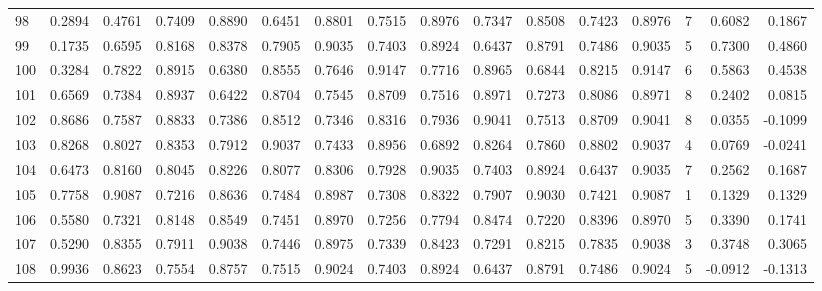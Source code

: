 \begin{tabular}{lrrrrrrrrrrrrrrr}
98  &      0.2894 &  0.4761 &  0.7409 &  0.8890 &  0.6451 &  0.8801 &  0.7515 &  0.8976 &  0.7347 &  0.8508 &   0.7423 &     0.8976 &      7 &                    0.6082 &                     0.1867 \\
99  &      0.1735 &  0.6595 &  0.8168 &  0.8378 &  0.7905 &  0.9035 &  0.7403 &  0.8924 &  0.6437 &  0.8791 &   0.7486 &     0.9035 &      5 &                    0.7300 &                     0.4860 \\
100 &      0.3284 &  0.7822 &  0.8915 &  0.6380 &  0.8555 &  0.7646 &  0.9147 &  0.7716 &  0.8965 &  0.6844 &   0.8215 &     0.9147 &      6 &                    0.5863 &                     0.4538 \\
101 &      0.6569 &  0.7384 &  0.8937 &  0.6422 &  0.8704 &  0.7545 &  0.8709 &  0.7516 &  0.8971 &  0.7273 &   0.8086 &     0.8971 &      8 &                    0.2402 &                     0.0815 \\
102 &      0.8686 &  0.7587 &  0.8833 &  0.7386 &  0.8512 &  0.7346 &  0.8316 &  0.7936 &  0.9041 &  0.7513 &   0.8709 &     0.9041 &      8 &                    0.0355 &                    -0.1099 \\
103 &      0.8268 &  0.8027 &  0.8353 &  0.7912 &  0.9037 &  0.7433 &  0.8956 &  0.6892 &  0.8264 &  0.7860 &   0.8802 &     0.9037 &      4 &                    0.0769 &                    -0.0241 \\
104 &      0.6473 &  0.8160 &  0.8045 &  0.8226 &  0.8077 &  0.8306 &  0.7928 &  0.9035 &  0.7403 &  0.8924 &   0.6437 &     0.9035 &      7 &                    0.2562 &                     0.1687 \\
105 &      0.7758 &  0.9087 &  0.7216 &  0.8636 &  0.7484 &  0.8987 &  0.7308 &  0.8322 &  0.7907 &  0.9030 &   0.7421 &     0.9087 &      1 &                    0.1329 &                     0.1329 \\
106 &      0.5580 &  0.7321 &  0.8148 &  0.8549 &  0.7451 &  0.8970 &  0.7256 &  0.7794 &  0.8474 &  0.7220 &   0.8396 &     0.8970 &      5 &                    0.3390 &                     0.1741 \\
107 &      0.5290 &  0.8355 &  0.7911 &  0.9038 &  0.7446 &  0.8975 &  0.7339 &  0.8423 &  0.7291 &  0.8215 &   0.7835 &     0.9038 &      3 &                    0.3748 &                     0.3065 \\
108 &      0.9936 &  0.8623 &  0.7554 &  0.8757 &  0.7515 &  0.9024 &  0.7403 &  0.8924 &  0.6437 &  0.8791 &   0.7486 &     0.9024 &      5 &                   -0.0912 &                    -0.1313 \\

\end{tabular}
